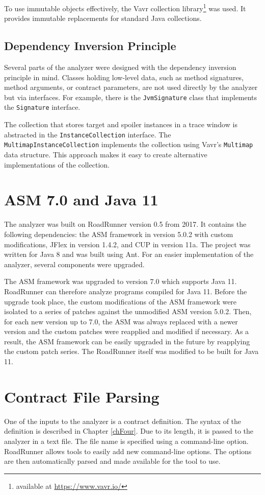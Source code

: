 To use immutable objects effectively, the Vavr collection
library\footnote{available at \url{https://www.vavr.io/}} was used. It provides
immutable replacements for standard Java collections.

\subsection{Dependency Inversion Principle}
Several parts of the analyzer were designed with the dependency inversion
principle in mind. Classes holding low-level data, such as method signatures,
method arguments, or contract parameters, are not used directly by the analyzer
but via interfaces. For example, there is the \texttt{JvmSignature} class that
implements the \texttt{Signature} interface.

The collection that stores target and spoiler instances in a trace window is
abstracted in the \texttt{InstanceCollection} interface. The
\texttt{MultimapInstanceCollection} implements the collection using Vavr's
\texttt{Multimap} data structure. This approach makes it easy to create
alternative implementations of the collection.

\section{ASM 7.0 and Java 11}
\label{asmAndJava}
The analyzer was built on RoadRunner version 0.5 from 2017. It contains the
following dependencies: the ASM framework in version 5.0.2 with custom
modifications, JFlex in version 1.4.2, and CUP in version 11a. The project was
written for Java 8 and was built using Ant. For an easier implementation of the
analyzer, several components were upgraded.

The ASM framework was upgraded to version 7.0 which supports Java 11. RoadRunner
can therefore analyze programs compiled for Java 11. Before the upgrade took
place, the custom modifications of the ASM framework were isolated to a series
of patches against the unmodified ASM version 5.0.2. Then, for each new version
up to 7.0, the ASM was always replaced with a newer version and the custom
patches were reapplied and modified if necessary. As a result, the ASM framework
can be easily upgraded in the future by reapplying the custom patch series. The
RoadRunner itself was modified to be built for Java 11.

\section{Contract File Parsing}
\label{cfParsing}
One of the inputs to the analyzer is a contract definition. The syntax of the
definition is described in Chapter \ref{chFour}. Due to its length, it is passed
to the analyzer in a text file. The file name is specified using a command-line
option. RoadRunner allows tools to easily add new command-line options. The
options are then automatically parsed and made available for the tool to use.


